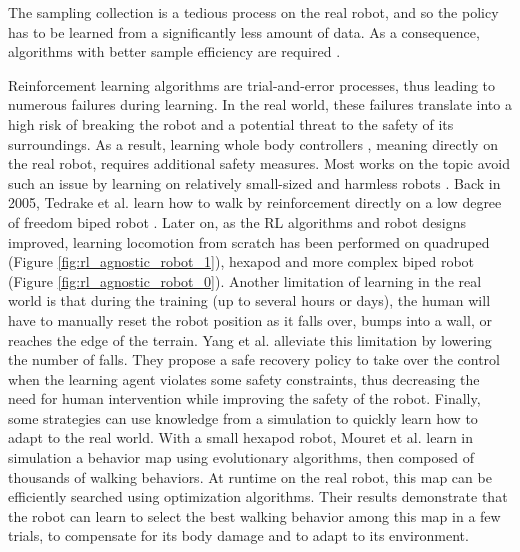 The sampling collection is a tedious process on the real robot, and so the policy has to be learned from a significantly less amount of data. As a consequence, algorithms with better sample efficiency are required \cite{sergey_2018, calinon_micro_rl}.

Reinforcement learning algorithms are trial-and-error processes, thus leading to numerous failures during learning. 
In the real world, these failures translate into a high risk of breaking the robot and a potential threat to the safety of its surroundings.
As a result, learning whole body controllers  \cite{rl_wild_heess_2022}, meaning directly on the real robot, requires additional safety measures.
Most works on the topic avoid such an issue by learning on relatively small-sized and harmless robots \cite{nao_rl_world_docking, rl_wild_heess_2022}. 
Back in 2005, Tedrake et al. learn how to walk by reinforcement directly on a low degree of freedom biped robot \cite{tedrake2005learning}. 
Later on, as the RL algorithms and robot designs improved, learning locomotion from scratch has been performed on quadruped \cite{sergey_2018} (Figure \ref{fig:rl_agnostic_robot_1}), hexapod \cite{deepmind_locomotion_RL} and more complex biped robot \cite{rl_wild_heess_2022} (Figure \ref{fig:rl_agnostic_robot_0}).
Another limitation of learning in the real world is that during the training (up to several hours or days), the human will have to manually reset the robot position as it falls over, bumps into a wall, or reaches the edge of the terrain.
Yang et al. \cite{yang2022safe} alleviate this limitation by lowering the number of falls. They propose a safe recovery policy to take over the control when the learning agent violates some safety constraints, thus decreasing the need for human intervention while improving the safety of the robot.
Finally, some strategies can use knowledge from a simulation to quickly learn how to adapt to the real world.
With a small hexapod robot, Mouret et al. \cite{Mouret_adapt_like_animals_2014} learn in simulation a behavior map using evolutionary algorithms, then composed of thousands of walking behaviors. At runtime on the real robot, this map can be efficiently searched using optimization algorithms. 
Their results demonstrate that the robot can learn to select the best walking behavior among this map in a few trials, to compensate for its body damage and to adapt to its environment.

